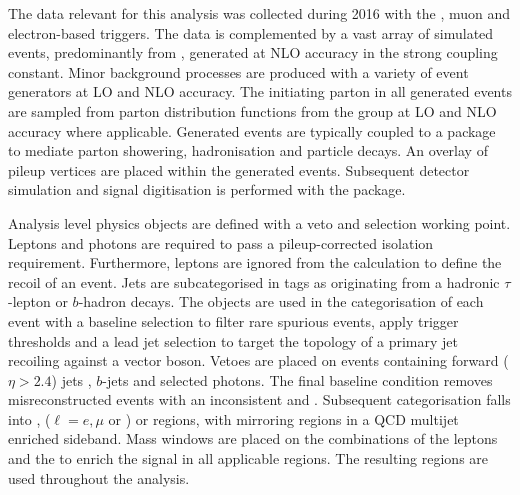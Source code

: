The data relevant for this analysis was collected during 2016 with the \ptmiss, muon and electron-based triggers. The data is complemented by a vast array of simulated events, predominantly from \IVj, generated at NLO accuracy in the strong coupling constant. Minor background processes are produced with a variety of event generators at LO and NLO accuracy. The initiating parton in all generated events are sampled from parton distribution functions from the \NNPDF group at LO and NLO accuracy where applicable. Generated events are typically coupled to a package to mediate parton showering, hadronisation and particle decays. An overlay of pileup vertices are placed within the generated events. Subsequent detector simulation and signal digitisation is performed with the \GEANT package.

Analysis level physics objects are defined with a veto and selection working point. Leptons and photons are required to pass a pileup-corrected isolation requirement. Furthermore, leptons are ignored from the \ptmiss calculation to define the recoil of an event. Jets are subcategorised in tags as originating from a hadronic $\tau$-lepton or $b$-hadron decays. The objects are used in the categorisation of each event with a baseline selection to filter rare spurious \ptmiss events, apply trigger thresholds and a lead jet selection to target the topology of a primary jet recoiling against a vector boson. Vetoes are placed on events containing forward (${\eta>2.4}$) jets , $b$-jets and selected photons. The final baseline condition removes misreconstructed events with an inconsistent \ptmiss and \ptmisscalo. Subsequent categorisation falls into \metplusjets, \ellplusjets ($\ell=e,\mu$ or \Ptauh) or \diellplusjets regions, with mirroring regions in a QCD multijet enriched sideband. Mass windows are placed on the combinations of the leptons and the \ptmiss to enrich the signal in all applicable regions. The resulting regions are used throughout the analysis.
